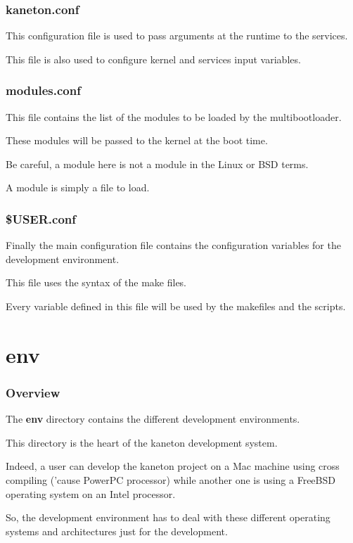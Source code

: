 \documentclass[8pt]{beamer}
\newcommand{\nl}[0]{\vspace{0.4cm}}
\begin{document}

\begin{frame}
  \frametitle{kaneton.conf}

  This configuration file is used to pass arguments at the runtime to the
  services.

  \nl

  This file is also used to configure kernel and services input variables.
\end{frame}


\begin{frame}
  \frametitle{modules.conf}

  This file contains the list of the modules to be loaded by the
  multibootloader.

  \nl

  These modules will be passed to the kernel at the boot time.

  \nl

  Be careful, a module here is not a module in the Linux or BSD terms.

  \nl

  A module is simply a file to load.
\end{frame}


\begin{frame}
  \frametitle{\$USER.conf}

  Finally the main configuration file contains the configuration
  variables for the development environment.

  \nl

  This file uses the syntax of the make files.

  \nl

  Every variable defined in this file will be used by the makefiles
  and the scripts.
\end{frame}

%
%

\section{env}


\begin{frame}
  \frametitle{Overview}

  The \textbf{env} directory contains the different development environments.

  \nl

  This directory is the heart of the kaneton development system.

  \nl

  Indeed, a user can develop the kaneton project on a Mac machine using
  cross compiling ('cause PowerPC processor) while another one is using
  a FreeBSD operating system on an Intel processor.

  \nl

  So, the development environment has to deal with these different operating
  systems and architectures just for the development.
\end{frame}
\end{document}
